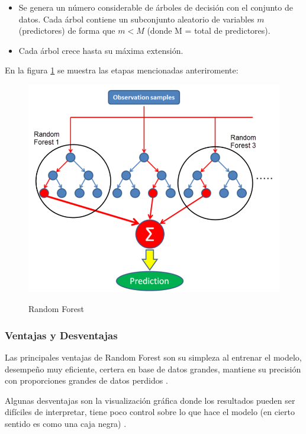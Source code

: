 \begin{itemize}
	\item[1-.] Se genera un número considerable de árboles de decisión con el conjunto de datos. Cada árbol contiene un subconjunto aleatorio de variables $m$ (predictores) de forma que $m < M$ (donde M = total de predictores).
	\item[2-.] Cada árbol crece hasta su máxima extensión.
\end{itemize}

\par En la figura \ref{fig:Random Forest} se muestra las etapas mencionadas anteriromente:

\begin{center}
	\begin{figure}[H]
		\centering
		\includegraphics[scale=0.5]{img/Marco Teorico/random-forest-1.png} 
		\label{fig:Random Forest}
		\caption{Random Forest}
	\end{figure}
\end{center}


\doublespacing
\subsubsection{Ventajas y Desventajas}

Las principales ventajas de Random Forest son su simpleza al entrenar el modelo, desempeño muy eficiente, certera en base de datos grandes, mantiene su precisión con proporciones grandes de datos perdidos \cite{canovas2017modification}.\\
\par Algunas desventajas son la visualización gráfica donde los resultados pueden ser difíciles de interpretar, tiene poco control sobre lo que hace el modelo (en cierto sentido es como una caja negra) \cite{canovas2017modification}.\\

